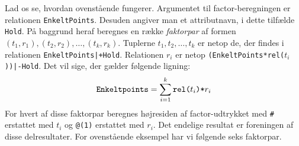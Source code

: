 \documentclass{article}
\newcounter{eks}
\begin{document}

Lad os se, hvordan ovenst\aa{}ende fungerer. Argumentet til factor-be\-reg\-ning\-en
er relationen \verb"EnkeltPoints". Desuden angiver man et attributnavn, i dette
tilf\ae{}lde \verb"Hold". P\aa{} baggrund heraf beregnes en r\ae{}kke {\em faktorpar} af
formen $(t_1,r_1),(t_2,r_2),\ldots,(t_k,r_k)$. Tuplerne 
$t_1,t_2,\ldots,t_k$ er netop de, der findes i relationen
\verb"EnkeltPoints|+Hold". Relationen $r_i$ er netop
\verb"(EnkeltPoints*rel("$t_i$\verb"))|-Hold". Det vil sige, der g\ae{}lder
f\o{}lgende ligning:
$$\mbox{\tt Enkeltpoints} = \sum_{i=1}^k \mbox{\tt rel(}t_i\mbox{\tt )*}r_i$$ 
For hvert af disse faktorpar beregnes h\o{}jresiden af factor-udtrykket med
\verb"#" erstattet med $t_i$ og \verb"@(1)" erstattet med $r_i$. Det
endelige resultat er foreningen af disse delresultater. For ovenst\aa{}ende
eksempel har vi f\o{}lgende seks faktorpar.
\end{document}
